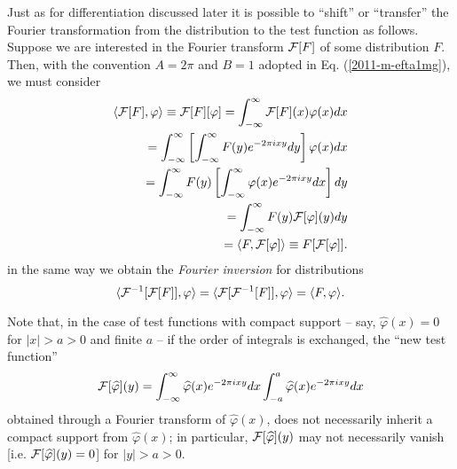Just as for differentiation discussed later it is possible to ``shift'' or ``transfer'' the
Fourier transformation from the distribution to the test function
as follows.
Suppose we are interested in the Fourier transform ${\cal F}[F]$ of some distribution $F$.
Then, with the convention
 $A=2\pi $ and $B=1$  adopted in Eq. (\ref{2011-m-efta1mg}), we must consider
\begin{equation}
\begin{split}
\langle  {\cal F}[F ], \varphi \rangle \equiv {\cal F}[F ][\varphi ]
=
\int_{-\infty}^\infty {\cal F}[F](x) \varphi (x) dx
\\ \qquad =
\int_{-\infty}^\infty \left[ \int_{-\infty}^\infty F(y) e^{- 2\pi ixy} dy \right] \varphi (x) dx
\\ \qquad =
\int_{-\infty}^\infty  F(y)  \left[ \int_{-\infty}^\infty \varphi (x) e^{- 2\pi ixy}  dx \right] dy
\\ \qquad =
\int_{-\infty}^\infty  F(y)  {\cal F}[ \varphi ](y) dy
\\ \qquad =
\langle  F , {\cal F}[\varphi ]\rangle \equiv F [{\cal F}[\varphi ]]
.
\end{split}
\end{equation}
in the same way we obtain the
{\em Fourier inversion}
for distributions
\begin{equation}
\langle   {\cal F}^{-1}[{\cal F}[F ]], \varphi \rangle
=
\langle   {\cal F}[{\cal F}^{-1}[F ]], \varphi \rangle
=
\langle    F  , \varphi \rangle
.
\end{equation}

Note that, in the case of test functions with compact support -- say, $\widehat{\varphi} (x) = 0$ for $\vert x \vert > a > 0$ and finite $a$
--  if the order of integrals is exchanged, the ``new test function''
\begin{equation}
{\cal F}[ \widehat{\varphi}] (y)=
\int_{-\infty}^\infty  \widehat{\varphi} (x) e^{- 2\pi ixy}  dx
\int_{-a}^a  \widehat{\varphi} (x) e^{- 2\pi ixy}  dx
\end{equation}
obtained through a Fourier transform of  $\widehat{\varphi} (x)$,
does not necessarily inherit a compact support  from $\widehat{\varphi} (x)$;
in particular,
${\cal F}[ \widehat{\varphi}] (y)$
may not necessarily vanish [i.e.  ${\cal F}[ \widehat{\varphi}] (y) = 0$] for $\vert y \vert > a > 0$.


